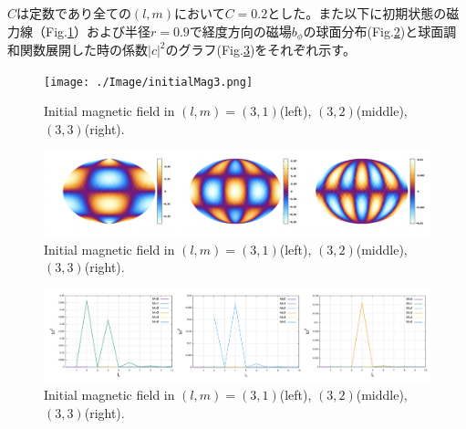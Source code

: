 \documentclass[12pt]{jsarticle}
\begin{document}
$C$は定数であり全ての$(l,m)$において$C=0.2$とした。また以下に初期状態の磁力線（Fig.\ref{initialMag1}）および半径$r=0.9$で経度方向の磁場$b_\phi$の球面分布(Fig.\ref{initialMag_moll})と球面調和関数展開した時の係数$|c|^2$のグラフ(Fig.\ref{initialMag_ff})をそれぞれ示す。
\begin{figure}[H]
\centering
\texttt{[image: ./Image/initialMag3.png]}
\caption{Initial magnetic field in $(l,m)=(3,1)$(left), $(3,2)$(middle), $(3,3)$(right).  } \label{initialMag1}
\end{figure}
\begin{figure}[H]
\centering
\includegraphics[height=1.0\textheight,width=1.0\hsize,angle=0,keepaspectratio]{./Image/mollwide_b0p.png}
\caption{Initial magnetic field in $(l,m)=(3,1)$(left), $(3,2)$(middle), $(3,3)$(right).  } \label{initialMag_moll}
\end{figure}
\begin{figure}[H]
\centering
\includegraphics[height=1.0\textheight,width=1.0\hsize,angle=0,keepaspectratio]{./Image/ff_b0p.png}
\caption{Initial magnetic field in $(l,m)=(3,1)$(left), $(3,2)$(middle), $(3,3)$(right).  } \label{initialMag_ff}
\end{figure}
\end{document}
